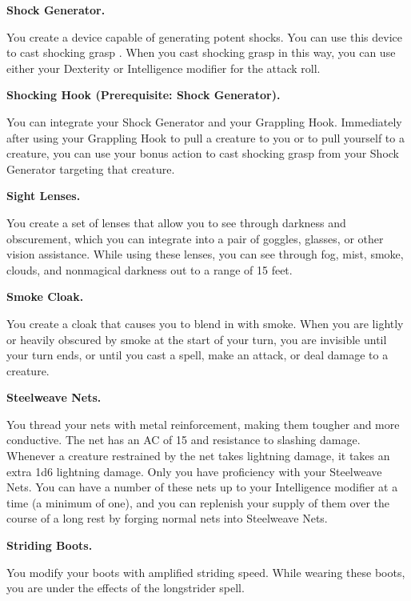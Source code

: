 \documentclass[11pt,twoside,openany]{book}  %
\begin{document}
\begin{fiveitemize}
	\item \textbf{Shock Generator.}
	
	You create a device capable of generating potent shocks. You can use this device to cast shocking grasp . When you cast shocking grasp in this way, you can use either your Dexterity or Intelligence modifier for the attack roll.

	\item \textbf{Shocking Hook (Prerequisite: Shock Generator).}
	
	You can integrate your Shock Generator and your Grappling Hook. Immediately after using your Grappling Hook to pull a creature to you or to pull yourself to a creature, you can use your bonus action to cast shocking grasp from your Shock Generator targeting that creature.

	\item \textbf{Sight Lenses.}
	
	You create a set of lenses that allow you to see through darkness and obscurement, which you can integrate into a pair of goggles, glasses, or other vision assistance. While using these lenses, you can see through fog, mist, smoke, clouds, and nonmagical darkness out to a range of 15 feet.

	\item \textbf{Smoke Cloak.}
	
	You create a cloak that causes you to blend in with smoke. When you are lightly or heavily obscured by smoke at the start of your turn, you are invisible until your turn ends, or until you cast a spell, make an attack, or deal damage to a creature.

	\item \textbf{Steelweave Nets.}
	
	You thread your nets with metal reinforcement, making them tougher and more conductive. The net has an AC of 15 and resistance to slashing damage. Whenever a creature restrained by the net takes lightning damage, it takes an extra 1d6 lightning damage.
	Only you have proficiency with your Steelweave Nets. You can have a number of these nets up to your Intelligence modifier at a time (a minimum of one), and you can replenish your supply of them over the course of a long rest by forging normal nets into Steelweave Nets.

	\item \textbf{Striding Boots.}
	
	You modify your boots with amplified striding speed. While wearing these boots, you are under the effects of the longstrider spell.


\end{fiveitemize}
\end{document}
